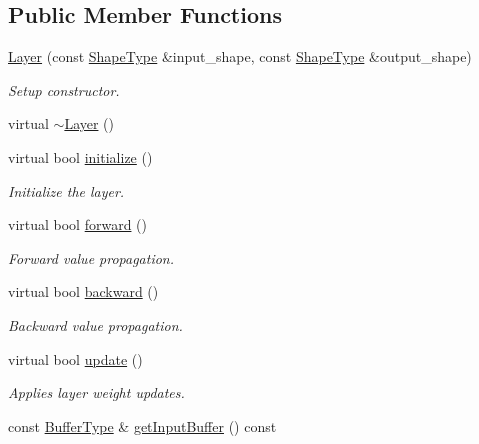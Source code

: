 \subsection*{Public Member Functions}
\begin{DoxyCompactItemize}
\item 
\hyperlink{classffnn_1_1layer_1_1_layer_a7f4c075aeb084e8479c9a188181d51e8}{Layer} (const \hyperlink{classffnn_1_1layer_1_1internal_1_1_interface_a945709b1d0ea54a51539b80d04485f5f}{Shape\-Type} \&input\-\_\-shape, const \hyperlink{classffnn_1_1layer_1_1internal_1_1_interface_a945709b1d0ea54a51539b80d04485f5f}{Shape\-Type} \&output\-\_\-shape)
\begin{DoxyCompactList}\small\item\em Setup constructor. \end{DoxyCompactList}\item 
virtual \hyperlink{classffnn_1_1layer_1_1_layer_a9bcc2f1e58199ee9ba7ae279d12fc177}{$\sim$\-Layer} ()
\item 
virtual bool \hyperlink{classffnn_1_1layer_1_1_layer_af4d17333f47c016a379748b9318c7b50}{initialize} ()
\begin{DoxyCompactList}\small\item\em Initialize the layer. \end{DoxyCompactList}\item 
virtual bool \hyperlink{classffnn_1_1layer_1_1_layer_a5e7b9e250678604ce373ab2b82cdb8e1}{forward} ()
\begin{DoxyCompactList}\small\item\em Forward value propagation. \end{DoxyCompactList}\item 
virtual bool \hyperlink{classffnn_1_1layer_1_1_layer_ad5dc8961ffb0446f31952adc1da62746}{backward} ()
\begin{DoxyCompactList}\small\item\em Backward value propagation. \end{DoxyCompactList}\item 
virtual bool \hyperlink{classffnn_1_1layer_1_1_layer_a0e87cf29789204037c4678ee4bfc8756}{update} ()
\begin{DoxyCompactList}\small\item\em Applies layer weight updates. \end{DoxyCompactList}\item 
const \hyperlink{classffnn_1_1layer_1_1_layer_a981f9bea21513a7b61222b1cda9294e7}{Buffer\-Type} \& \hyperlink{classffnn_1_1layer_1_1_layer_a6c330b4b356e0ed768248943e763b87f}{get\-Input\-Buffer} () const 

\end{DoxyCompactItemize}
